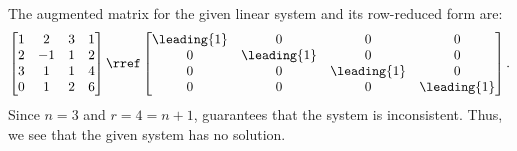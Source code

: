 The augmented matrix for the given linear system and its row-reduced form are:
\begin{align*}
\begin{bmatrix}
1 & 2 & 3 & 1\\
2 & -1 & 1 & 2\\
3 & 1 & 1 & 4\\
0 & 1 & 2 & 6
\end{bmatrix}
\rref
\begin{bmatrix}
\leading{1} & 0 & 0 & 0\\
0 & \leading{1} & 0  & 0\\
0 & 0 & \leading{1} & 0\\
0 & 0 & 0 & \leading{1}
\end{bmatrix}.
\end{align*}
Since $n = 3$ and $r = 4 = n+1$,   guarantees that the system is inconsistent.  Thus, we see that the given system has no solution.